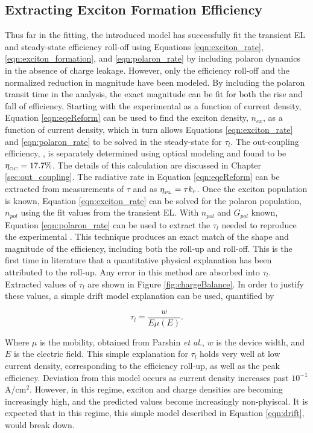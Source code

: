 \documentclass[../thesis.tex]{subfiles}
\begin{document}
\subsection{Extracting Exciton Formation Efficiency}

Thus far in the fitting, the introduced model has successfully fit the transient EL and steady-state efficiency roll-off using Equations \ref{eqn:exciton_rate},\ref{eqn:exciton_formation}, and \ref{eqn:polaron_rate} by including polaron dynamics in the absence of charge leakage.
However, only the efficiency roll-off and the normalized reduction in magnitude have been modeled. 
By including the polaron transit time in the analysis, the exact magnitude can be fit for both the rise and fall of efficiency. 
Starting with the experimental \eqe as a function of current density, Equation \ref{eqn:eqeReform} can be used to find the exciton density, $n_{ex}$, as a function of current density, which in turn allows Equations \ref{eqn:exciton_rate} and \ref{eqn:polaron_rate} to be solved in the steady-state for $\tau_l$.  
The out-coupling efficiency, \oc, is separately determined using optical modeling and found to be $\eta_{_\text{\tiny OC}}=17.7\%$.\supercite{Furno2010,Furno2012}  
The details of this calculation are discussed in Chapter \ref{sec:out_coupling}.
The radiative rate in Equation \ref{eqn:eqeReform} can be extracted from measurements of $\tau$ and \pl as $\eta_{_\text{\tiny PL}}=\tau k_r$.  Once the exciton population is known, Equation \ref{eqn:exciton_rate} can be solved for the polaron population, $n_{pol}$ using the fit values from the transient EL.  With $n_{pol}$ and $G_{pol}$ known, Equation \ref{eqn:polaron_rate} can be used to extract the $\tau_l$ needed to reproduce the experimental \eqe.  
This technique produces an exact match of the shape and magnitude of the efficiency, including both the roll-up and roll-off.
This is the first time in literature that a quantitative physical explanation has been attributed to the roll-up.
Any error in this method are absorbed into $\tau_l$.
Extracted values of $\tau_l$ are shown in Figure \ref{fig:chargeBalance}.
In order to justify these values, a simple drift model explanation can be used, quantified by

\begin{equation}
\tau_l=\frac{w}{E\mu(E)}.
\label{eqn:drift}
\end{equation}

Where $\mu$ is the mobility, obtained from Parshin \textit{et al.},\supercite{Parshin2006} $w$ is the device width, and $E$ is the electric field.  
This simple explanation for $\tau_l$ holds very well at low current density, corresponding to the efficiency roll-up, as well as the peak efficiency.  
Deviation from this model occurs as current density increases past $10^{-1}$ A/cm$^2$.  
However, in this regime, exciton and charge densities are becoming increasingly high, and the predicted values become increasingly non-phyiscal.
It is expected that in this regime, this simple model described in Equation \ref{eqn:drift}, would break down.
\end{document}
